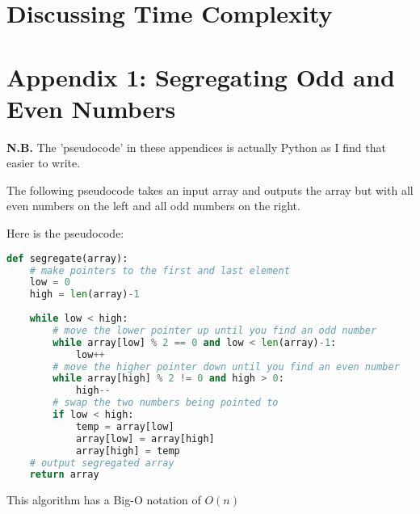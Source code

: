 \documentclass{report}
\begin{document}

\chapter{Discussing Time Complexity}
\chapter*{Appendix 1: Segregating Odd and Even Numbers}
\textbf{N.B.} The 'pseudocode' in these appendices is actually Python as I find that easier to write.

The following pseudocode takes an input array and outputs the array but with all even numbers on the left and all odd numbers on the right.

Here is the pseudocode:
\begin{lstlisting}[language=Python]
def segregate(array):
    # make pointers to the first and last element
    low = 0
    high = len(array)-1
    
    while low < high:
        # move the lower pointer up until you find an odd number
        while array[low] % 2 == 0 and low < len(array)-1:
            low++
        # move the higher pointer down until you find an even number
        while array[high] % 2 != 0 and high > 0:
            high--
        # swap the two numbers being pointed to
        if low < high:
            temp = array[low]
            array[low] = array[high]
            array[high] = temp
    # output segregated array
    return array
\end{lstlisting}
This algorithm has a Big-O notation of $O(n)$
\end{document}
